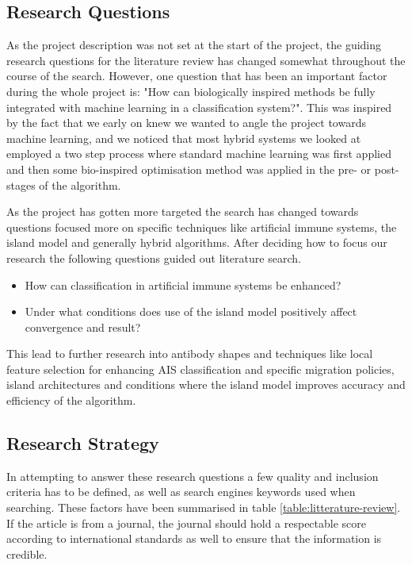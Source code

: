 \subsection{Research Questions}
As the project description was not set at the start of the project, the guiding research questions for the literature review has changed somewhat throughout the course of the search. However, one question that has been an important factor during the whole project is: "How can biologically inspired methods be fully integrated with machine learning in a classification system?". This was inspired by the fact that we early on knew we wanted to angle the project towards machine learning, and we noticed that most hybrid systems we looked at employed a two step process where standard machine learning was first applied and then some bio-inspired optimisation method was applied in the pre- or post-stages of the algorithm. 

As the project has gotten more targeted the search has changed towards questions focused more on specific techniques like artificial immune systems, the island model and generally hybrid algorithms. After deciding how to focus our research the following questions guided out literature search.

\begin{itemize}
  \item How can classification in artificial immune systems be enhanced?
  \item Under what conditions does use of the island model positively affect convergence and result?
\end{itemize}

This lead to further research into antibody shapes and techniques like local feature selection for enhancing AIS classification and specific migration policies, island architectures and conditions where the island model improves accuracy and efficiency of the algorithm. 


\subsection{Research Strategy}
In attempting to answer these research questions a few quality and inclusion criteria has to be defined, as well as search engines keywords used when searching. These factors have been summarised in table \ref{table:litterature-review}. If the article is from a journal, the journal should hold a respectable score according to international standards as well to ensure that the information is credible.   

